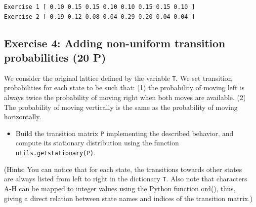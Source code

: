 \documentclass{article}
\providecommand{\tightlist}{%
      \setlength{\itemsep}{0pt}\setlength{\parskip}{0pt}}
\begin{document}
    \begin{Verbatim}[commandchars=\\\{\}]
Exercise 1 [ 0.10 0.15 0.15 0.10 0.10 0.15 0.15 0.10 ]
Exercise 2 [ 0.19 0.12 0.08 0.04 0.29 0.20 0.04 0.04 ]
    \end{Verbatim}

    \subsection{Exercise 4: Adding non-uniform transition probabilities (20
P)}\label{exercise-4-adding-non-uniform-transition-probabilities-20-p}

We consider the original lattice defined by the variable \texttt{T}. We
set transition probabilities for each state to be such that: (1) the
probability of moving left is always twice the probability of moving
right when both moves are available. (2) The probability of moving
vertically is the same as the probability of moving horizontally.

\begin{itemize}
\tightlist
\item
  Build the transition matrix \texttt{P} implementing the described
  behavior, and compute its stationary distribution using the function
  \texttt{utils.getstationary(P)}.
\end{itemize}

(Hints: You can notice that for each state, the transitions towards
other states are always listed from left to right in the dictionary
\texttt{T}. Also note that characters A-H can be mapped to integer
values using the Python function ord(), thus, giving a direct relation
between state names and indices of the transition matrix.)
\end{document}
